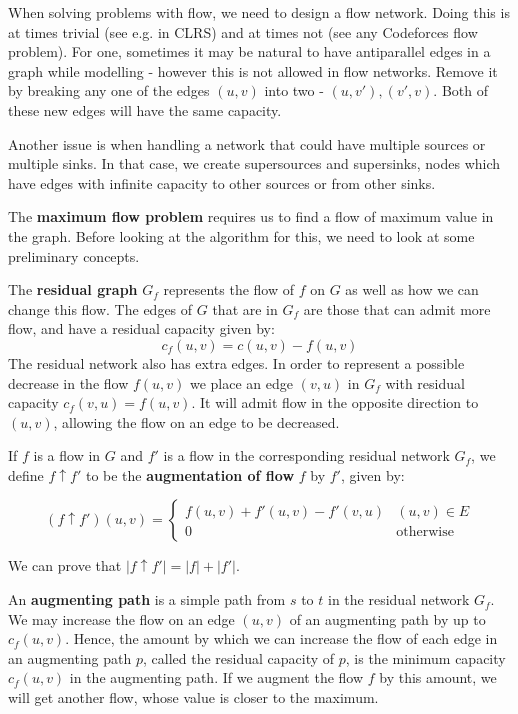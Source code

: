 \documentclass[12pt,letterpaper]{article}
\theoremstyle{definition}
\begin{document}
When solving problems with flow, we need to design a flow network. Doing this is at times trivial (see e.g. in CLRS) and at times not (see any Codeforces flow problem). For one, sometimes it may be natural to have antiparallel edges in a graph while modelling - however this is not allowed in flow networks. Remove it by  breaking any one of the edges $(u,v)$ into two - $(u,v'), (v',v)$. Both of these new edges will have the same capacity.

Another issue is when handling a network that could have multiple sources or multiple sinks. In that case, we create supersources and supersinks, nodes which have edges with infinite capacity to other sources or from other sinks.

The \textbf{maximum flow problem} requires us to find a flow of maximum value in the graph. Before looking at the algorithm for this, we need to look at some preliminary concepts.

The \textbf{residual graph} $G_f$ represents the flow of $f$ on $G$ as well as how we can change this flow. The edges of $G$ that are in $G_f$ are those that can admit more flow, and have a residual capacity given by:
\[c_f(u,v) = c(u,v) - f(u,v)\]
The residual network also has extra edges. In order to represent a possible decrease in the flow $f(u,v)$ we place an edge $(v,u)$ in $G_f$ with residual capacity $c_f(v,u) = f(u,v)$. It will admit flow in the opposite direction to $(u,v)$, allowing the flow on an edge to be decreased.

If $f$ is a flow in $G$ and $f'$ is a flow in the corresponding residual network $G_f$, we define $f \uparrow f'$ to be the \textbf{augmentation of flow} $f$ by $f'$, given by:

\[(f \uparrow f')(u,v) = \begin{cases}
  f(u,v) + f'(u,v) - f'(v,u) & (u,v) \in E \\
  0 & \text{otherwise}
\end{cases}\]

We can prove that $|f \uparrow f'| = |f| + |f'|$.

An \textbf{augmenting path} is a simple path from $s$ to $t$ in the residual network $G_f$. We may increase the flow on an edge $(u,v)$ of an augmenting path by up to $c_f(u,v)$. Hence, the amount by which we can increase the flow of each edge in an augmenting path $p$, called the residual capacity of $p$, is the minimum capacity $c_f(u,v)$ in the augmenting path. If we augment the flow $f$ by this amount, we will get another flow, whose value is closer to the maximum.
\end{document}
